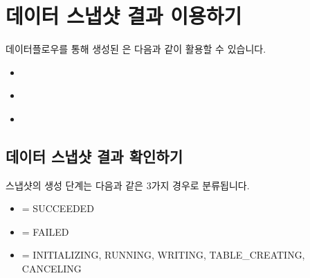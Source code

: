 \documentclass[letterpaper,10pt,english]{sphinxmanual}
\begin{document}
\section{데이터 스냅샷 결과 이용하기}
\label{\detokenize{discovery/part07/data_snapshot:id1}}\label{\detokenize{discovery/part07/data_snapshot::doc}}
데이터플로우를 통해 생성된 은 다음과 같이 활용할 수 있습니다.
\begin{itemize}
\item {} 
{\hyperref[\detokenize{discovery/part07/data_snapshot:snapshot-result-check}]{}}

\item {} 
{\hyperref[\detokenize{discovery/part07/data_snapshot:snapshot-into-druid}]{}}

\item {} 
{\hyperref[\detokenize{discovery/part07/data_snapshot:snapshot-into-csv}]{}}

\end{itemize}


\subsection{데이터 스냅샷 결과 확인하기}
\label{\detokenize{discovery/part07/data_snapshot:snapshot-result-check}}\label{\detokenize{discovery/part07/data_snapshot:id2}}
스냅샷의 생성 단계는 다음과 같은 3가지 경우로 분류됩니다.
\begin{itemize}
\item {} 
 = SUCCEEDED

\item {} 
 = FAILED

\item {} 
 = INITIALIZING, RUNNING, WRITING, TABLE\_CREATING, CANCELING

\end{itemize}
\end{document}
